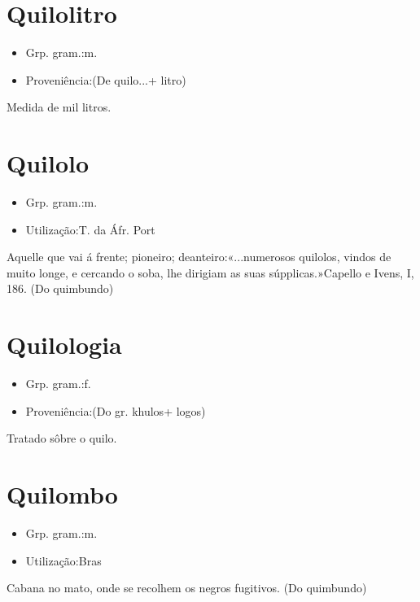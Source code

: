 \section{Quilolitro}
\begin{itemize}
\item {Grp. gram.:m.}
\end{itemize}
\begin{itemize}
\item {Proveniência:(De \textunderscore quilo...\textunderscore  + \textunderscore litro\textunderscore )}
\end{itemize}
Medida de mil litros.
\section{Quilolo}
\begin{itemize}
\item {Grp. gram.:m.}
\end{itemize}
\begin{itemize}
\item {Utilização:T. da Áfr. Port}
\end{itemize}
Aquelle que vai á frente; pioneiro; deanteiro:«\textunderscore ...numerosos quilolos, vindos de muito longe, e cercando o soba, lhe dirigiam as suas súpplicas.\textunderscore »Capello e Ivens, I, 186.
(Do quimbundo)
\section{Quilologia}
\begin{itemize}
\item {Grp. gram.:f.}
\end{itemize}
\begin{itemize}
\item {Proveniência:(Do gr. \textunderscore khulos\textunderscore  + \textunderscore logos\textunderscore )}
\end{itemize}
Tratado sôbre o quilo.
\section{Quilombo}
\begin{itemize}
\item {Grp. gram.:m.}
\end{itemize}
\begin{itemize}
\item {Utilização:Bras}
\end{itemize}
Cabana no mato, onde se recolhem os negros fugitivos.
(Do quimbundo)
